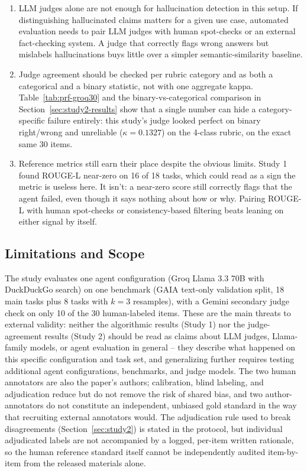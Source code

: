 \documentclass[conference]{IEEEtran}
\begin{document}
\begin{enumerate}
\item LLM judges alone are not enough for hallucination detection in this setup. If distinguishing hallucinated claims matters for a given use case, automated evaluation needs to pair LLM judges with human spot-checks or an external fact-checking system. A judge that correctly flags wrong answers but mislabels hallucinations buys little over a simpler semantic-similarity baseline.

\item Judge agreement should be checked per rubric category and as both a categorical and a binary statistic, not with one aggregate kappa. Table~\ref{tab:prf-groq30} and the binary-vs-categorical comparison in Section~\ref{sec:study2-results} show that a single number can hide a category-specific failure entirely: this study's judge looked perfect on binary right/wrong and unreliable ($\kappa=0.1327$) on the 4-class rubric, on the exact same 30 items.

\item Reference metrics still earn their place despite the obvious limits. Study 1 found ROUGE-L near-zero on 16 of 18 tasks, which could read as a sign the metric is useless here. It isn't: a near-zero score still correctly flags that the agent failed, even though it says nothing about how or why. Pairing ROUGE-L with human spot-checks or consistency-based filtering beats leaning on either signal by itself.
\end{enumerate}

\subsection{Limitations and Scope}
The study evaluates one agent configuration (Groq Llama 3.3 70B with DuckDuckGo search) on one benchmark (GAIA text-only validation split, 18 main tasks plus 8 tasks with $k=3$ resamples), with a Gemini secondary judge check on only 10 of the 30 human-labeled items. These are the main threats to external validity: neither the algorithmic results (Study 1) nor the judge-agreement results (Study 2) should be read as claims about LLM judges, Llama-family models, or agent evaluation in general -- they describe what happened on this specific configuration and task set, and generalizing further requires testing additional agent configurations, benchmarks, and judge models. The two human annotators are also the paper's authors; calibration, blind labeling, and adjudication reduce but do not remove the risk of shared bias, and two author-annotators do not constitute an independent, unbiased gold standard in the way that recruiting external annotators would. The adjudication rule used to break disagreements (Section~\ref{sec:study2}) is stated in the protocol, but individual adjudicated labels are not accompanied by a logged, per-item written rationale, so the human reference standard itself cannot be independently audited item-by-item from the released materials alone.
\end{document}
